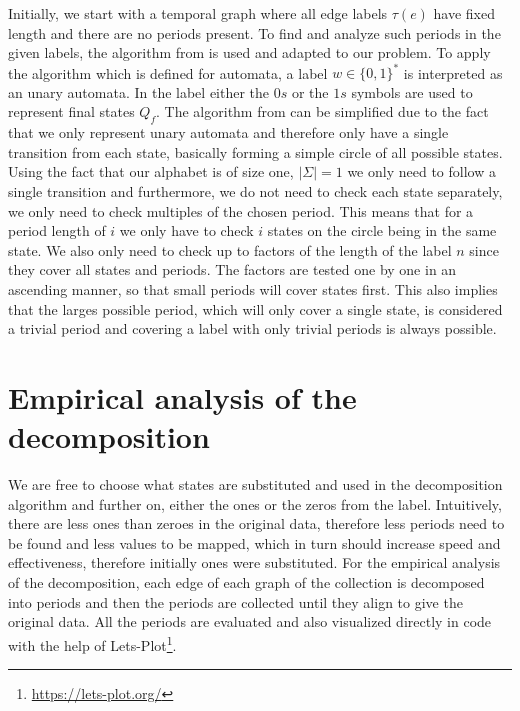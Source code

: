 Initially, we start with a temporal graph where all edge labels $\tau(e)$ have fixed length and there are no periods present. To find and analyze such periods in the given labels, the algorithm from \cite{DBLP:journals/corr/abs-2107-04683} is used and adapted to our problem. To apply the algorithm which is defined for automata, a label $ w \in \{0,1\}^*$ is interpreted as an unary automata. In the label either the $0s$ or the $1s$ symbols are used to represent final states $Q_f$. The algorithm from \cite{DBLP:journals/corr/abs-2107-04683} can be simplified due to the fact that we only represent unary automata and therefore only have a single transition from each state, basically forming a simple circle of all possible states. Using the fact that our alphabet is of size one, $|\Sigma| = 1$ we only need to follow a single transition and furthermore, we do not need to check each state separately, we only need to check multiples of the chosen period. This means that for a period length of $i$ we only have to check $i$ states on the circle being in the same state. We also only need to check up to factors of the length of the label $n$ since they cover all states and periods. The factors are tested one by one in an ascending manner, so that small periods will cover states first. This also implies that the larges possible period, which will only cover a single state, is considered a trivial period and covering a label with only trivial periods is always possible.

\section{Empirical analysis of the decomposition}

We are free to choose what states are substituted and used in the decomposition algorithm and further on, either the ones or the zeros from the label. Intuitively, there are less ones than zeroes in the original data, therefore less periods need to be found and less values to be mapped, which in turn should increase speed and effectiveness, therefore initially ones were substituted. For the empirical analysis of the decomposition, each edge of each graph of the collection is decomposed into periods and then the periods are collected until they align to give the original data. All the periods are evaluated and also visualized directly in code with the help of Lets-Plot\footnote{\url{https://lets-plot.org/}}.

